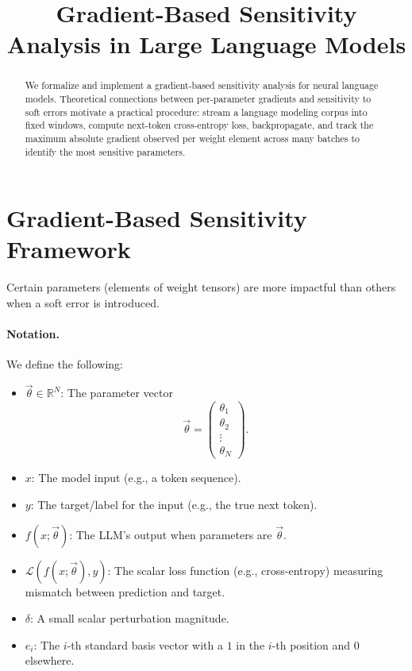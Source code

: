 \documentclass[12pt]{article}
\title{\textbf{Gradient-Based Sensitivity Analysis in Large Language Models}}
\author{}
\date{}
\begin{document}
\maketitle
\vspace{-1.5em}
\hrulefill

\begin{abstract}
We formalize and implement a gradient-based sensitivity analysis for neural language models. 
Theoretical connections between per-parameter gradients and sensitivity to soft errors motivate a practical procedure: 
stream a language modeling corpus into fixed windows, compute next-token cross-entropy loss, backpropagate, 
and track the maximum absolute gradient observed per weight element across many batches to identify the most sensitive parameters.
\end{abstract}

\section{Gradient-Based Sensitivity Framework}
Certain parameters (elements of weight tensors) are more impactful than others when a soft error is introduced. 

\paragraph{Notation.} We define the following:
\begin{itemize}
  \item $\vec{\theta} \in \mathbb{R}^N$: The parameter vector
  \[
    \vec{\theta} =
    \begin{pmatrix}
    \theta_{1} \\
    \theta_{2} \\
    \vdots \\
    \theta_{N}
    \end{pmatrix}.
  \]
  \item $x$: The model input (e.g., a token sequence).
  \item $y$: The target/label for the input (e.g., the true next token).
  \item $f(x;\vec{\theta})$: The LLM's output when parameters are $\vec{\theta}$.
  \item $\mathcal{L}(f(x;\vec{\theta}),y)$: The scalar loss function (e.g., cross-entropy) measuring mismatch between prediction and target.
  \item $\delta$: A small scalar perturbation magnitude.
  \item $e_i$: The $i$-th standard basis vector with a $1$ in the $i$-th position and $0$ elsewhere.
\end{itemize}
\end{document}
